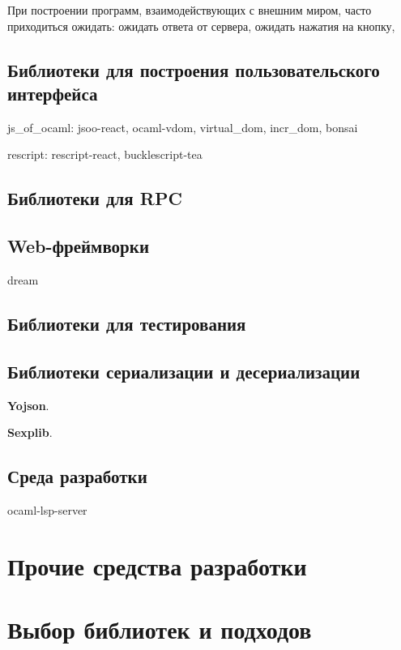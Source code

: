 При построении программ, взаимодействующих с внешним миром,
часто приходиться ожидать:
ожидать ответа от сервера,
ожидать нажатия на кнопку,

\subsection{Библиотеки для построения пользовательского интерфейса}

\TODO

js\_of\_ocaml: jsoo-react, ocaml-vdom, virtual\_dom, incr\_dom, bonsai

rescript: rescript-react, bucklescript-tea

\subsection{Библиотеки для RPC}

\TODO

\subsection{Web-фреймворки}

dream  \TODO

\subsection{Библиотеки для тестирования}

\TODO

\subsection{Библиотеки сериализации и десериализации}

\TODO

\textbf{Yojson}.

\textbf{Sexplib}.

\subsection{Среда разработки}

ocaml-lsp-server

\section{Прочие средства разработки}

\section{Выбор библиотек и подходов}

\TODO

